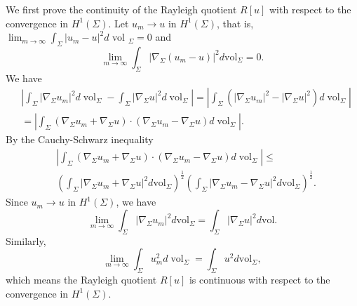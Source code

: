 \documentclass[a4, 12pt]{amsart}
\numberwithin{equation}{section} \numberwithin{equation}{section}
\begin{document}
We first prove the continuity of the Rayleigh quotient $R[u]$ with respect to the convergence in $H^{1}(\Sigma)$.
Let $u_m \rightarrow u$ in $H^{1}(\Sigma)$, that is, $\lim _{m \rightarrow \infty} \int_{\Sigma}\left|u_m-u\right|^{2} d$ vol $_{\Sigma}=0$ and
\begin{equation*}
\lim _{m \rightarrow \infty} \int_{\Sigma}\left|\nabla_{\Sigma}\left(u_m-u\right)\right|^{2} d \mathrm{vol}_{\Sigma}=0.
\end{equation*}
We have
\begin{equation}
\begin{aligned}
&  \left|\int_{\Sigma}\left| \nabla_{\Sigma} u_m\right|^{2} d \operatorname{vol}_{\Sigma}-\int_{\Sigma}\left|\nabla_{\Sigma}u\right|^{2} d \operatorname{vol}_{\Sigma}\right|=\left|\int_{\Sigma}\left(\left|\nabla_{\Sigma} u_m\right|^{2}-\left|\nabla_{\Sigma} u\right|^{2}\right) d \operatorname{vol}_{\Sigma}\right| \\
&= \left|\int_{\Sigma}\left(\nabla_{\Sigma} u_m+\nabla_{\Sigma} u\right) \cdot\left(\nabla_{\Sigma} u_m-\nabla_{\Sigma} u\right) d \operatorname{vol}_{\Sigma}\right|.
\end{aligned}
\end{equation}
By the Cauchy-Schwarz inequality
\begin{equation*}
\begin{aligned}
& \left|\int_{\Sigma}\left(\nabla_{\Sigma} u_m+\nabla_{\Sigma} u\right) \cdot\left(\nabla_{\Sigma} u_m-\nabla_{\Sigma} u\right) d \operatorname{vol}_{\Sigma}\right| \leq \\
& \left(\int_{\Sigma}\left|\nabla_{\Sigma} u_m+\nabla_{\Sigma} u\right|^{2} d \mathrm{vol}_{\Sigma}\right)^{\frac{1}{2}}\left(\int_{\Sigma}\left|\nabla_{\Sigma} u_m-\nabla_{\Sigma} u\right|^{2} d \mathrm{vol}_{\Sigma}\right)^{\frac{1}{2}}.
\end{aligned}
\end{equation*}
Since $u_m \rightarrow u$ in $H^{1}(\Sigma)$, we have \begin{equation*}\lim _{m \rightarrow \infty} \int_{\Sigma}\left|\nabla_{\Sigma} u_m\right|^{2} d \mathrm{vol}_{\Sigma}=\int_{\Sigma}\left|\nabla_{\Sigma} u\right|^{2} d \mathrm{vol}.\end{equation*} Similarly, \begin{equation*}\lim _{m \rightarrow \infty} \int_{\Sigma} u_m^{2} d \operatorname{vol}_{\Sigma}=\int_{\Sigma} u^{2} d \mathrm{vol}_{\Sigma},\end{equation*} which means the Rayleigh quotient $R[u]$ is continuous with respect to the convergence in $H^{1}(\Sigma)$.
\end{document}
